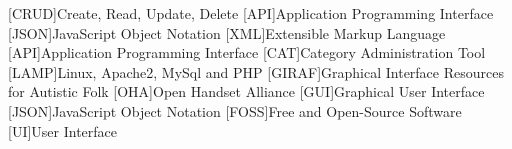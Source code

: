 [CRUD]{Create, Read, Update, Delete}
[API]{Application Programming Interface}
[JSON]{JavaScript Object Notation}
[XML]{Extensible Markup Language}
[API]{Application Programming Interface}
[CAT]{Category Administration Tool}
[LAMP]{Linux, Apache2, MySql and PHP}
[GIRAF]{Graphical Interface Resources for Autistic Folk}
[OHA]{Open Handset Alliance}
[GUI]{Graphical User Interface}
[JSON]{JavaScript Object Notation}
[FOSS]{Free and Open-Source Software}
[UI]{User Interface}